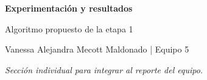 \documentclass[10pt,letterpaper]{article}
\begin{document}
{\Large\bfseries\color{azul} Experimentación y resultados}\par
{\large Algoritmo propuesto de la etapa 1}\par
Vanessa Alejandra Mecott Maldonado | Equipo 5\par
\textit{Sección individual para integrar al reporte del equipo.}



\end{document}
